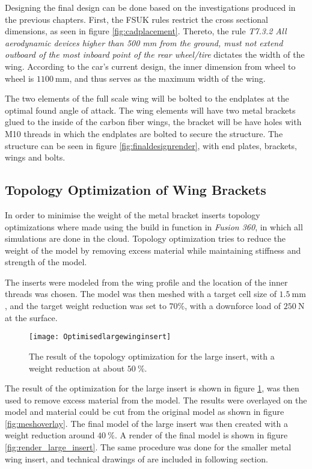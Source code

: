  Designing the final design can be done based on the investigations produced in the previous chapters. First, the FSUK rules restrict the cross sectional dimensions, as seen in figure \ref{fig:cadplacement}. Thereto, the rule \emph{T7.3.2   All aerodynamic devices higher than 500 mm from the ground, must not extend outboard of the most inboard point of the rear wheel/tire} dictates the width of the wing. According to the car's current design, the inner dimension from wheel to wheel is $\SI{1100}{\milli\metre}$, and thus serves as the maximum width of the wing.

  The two elements of the full scale wing will be bolted to the endplates at the optimal found angle of attack. The wing elements will have two metal brackets glued to the inside of the carbon fiber wings, the bracket will be have holes with M10 threads in which the endplates are bolted to secure the structure. The structure can be seen in figure \ref{fig:finaldesignrender}, with end plates, brackets, wings and bolts.

  \subsection{Topology Optimization of Wing Brackets}

  In order to minimise the weight of the metal bracket inserts topology optimizations where made using the build in function in \emph{Fusion 360}, in which all simulations are done in the cloud. Topology optimization tries to reduce the weight of the model by removing excess material while maintaining stiffness and strength of the model.

  The inserts were modeled from the wing profile and the location of the inner threads was chosen. The model was then meshed with a target cell size of $\SI{1.5}{\milli\metre}$, and the target weight reduction was set to $70\%$, with a downforce load of $\SI{250}{\newton}$ at the surface.

  \begin{figure}
    \texttt{[image: Optimisedlargewinginsert]}
    \caption{The result of the topology optimization for the large insert, with a weight reduction at about $\SI{50}{\%}$.}
    \label{fig:topology_large_insert}
  \end{figure}

  The result of the optimization for the large insert is shown in figure \ref{fig:topology_large_insert}, was then used to remove excess material from the model. The results were overlayed on the model and material could be cut from the original model as shown in figure
  \ref{fig:meshoverlay}. The final model of the large insert was then created with a weight reduction around $\SI{40}{\%}$. A render of the final model is shown in
  figure \ref{fig:render_large_insert}. The same procedure was done for the smaller metal wing insert, and technical drawings of are included in following section. 

